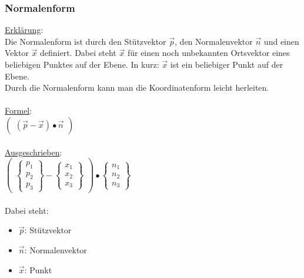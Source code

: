 
\subsubsection{Normalenform}
\underline{Erklärung}: \\
Die Normalenform ist durch den Stützvektor $\vec{p}$, 
den Normalenvektor $\vec{n}$ und einen Vektor $\vec{x}$ definiert.
Dabei steht $\vec{x}$ für einen noch unbekannten Ortsvektor eines beliebigen Punktes auf der Ebene. 
In kurz: $\vec{x}$ ist ein beliebiger Punkt auf der Ebene. \\
Durch die Normalenform kann man die Koordinatenform leicht herleiten.
\\\\
\underline{Formel}: \\
$
\begin{pmatrix}
    (\vec{p} - \vec{x}) \bullet \vec{n}
\end{pmatrix}
$ 
\\\\
\underline{Ausgeschrieben}: \\
$
\begin{pmatrix}
    \begin{Bmatrix}
        p_1 \\ p_2 \\ p_3
    \end{Bmatrix} 
    - 
    \begin{Bmatrix}
        x_1 \\ x_2 \\ x_3
    \end{Bmatrix}
\end{pmatrix}
\bullet 
\begin{Bmatrix}
    n_1 \\ n_2 \\ n_3
\end{Bmatrix}
$
\\\\
Dabei steht: 
\begin{itemize}
    \item $\vec{p}$: Stützvektor
    \item $\vec{n}$: Normalenvektor
    \item $\vec{x}$: Punkt
\end{itemize}

